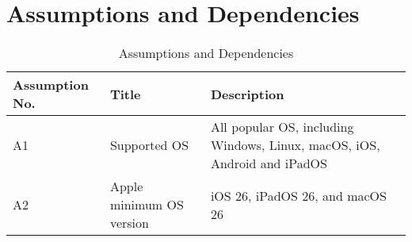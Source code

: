 \documentclass[11pt]{article}
\begin{document}
\section{Assumptions and Dependencies}
\begin{table}[h]
    \centering
    \caption{Assumptions and Dependencies}
    \begin{tabular}{p{2cm} p{3.5cm} p{10cm}}
        \toprule
        Assumption No. 
        & Title 
        & Description \\
        
        \midrule
        A1 
        & Supported OS
        & All popular OS, including Windows, Linux, macOS, iOS, Android and iPadOS \\

        \midrule
        A2
        & Apple minimum OS version 
        & iOS 26, iPadOS 26, and macOS 26  \\
 
        \bottomrule
    \end{tabular}
    \label{tab:docs_assumptions_and_dependencies}
\end{table}

\end{document}
